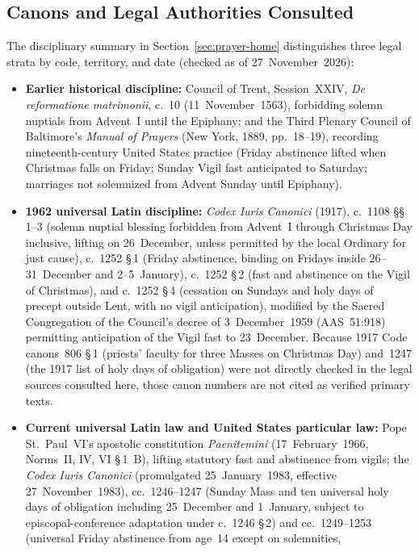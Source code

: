 \subsection{Canons and Legal Authorities Consulted}

The disciplinary summary in Section~\ref{sec:prayer-home} distinguishes three
legal strata by code, territory, and date (checked as of 27~November~2026):

\begin{itemize}
\item \textbf{Earlier historical discipline:} Council of Trent, Session~XXIV,
\textit{De reformatione matrimonii}, c.~10 (11~November~1563), forbidding solemn
nuptials from Advent~I until the Epiphany; and the Third Plenary Council of
Baltimore's \textit{Manual of Prayers} (New York, 1889, pp.~18--19), recording
nineteenth-century United States practice (Friday abstinence lifted when
Christmas falls on Friday; Sunday Vigil fast anticipated to Saturday; marriages
not solemnized from Advent Sunday until Epiphany).
\item \textbf{1962 universal Latin discipline:} \textit{Codex Iuris Canonici}
(1917), c.~1108 \S\S\,1--3 (solemn nuptial blessing forbidden from Advent~I
through Christmas Day inclusive, lifting on 26~December, unless permitted by the
local Ordinary for just cause), c.~1252 \S\,1 (Friday abstinence, binding on
Fridays inside 26--31~December and 2--5~January), c.~1252 \S\,2 (fast and
abstinence on the Vigil of Christmas), and c.~1252 \S\,4 (cessation on Sundays
and holy days of precept outside Lent, with no vigil anticipation), modified by
the Sacred Congregation of the Council's decree of 3~December~1959 (AAS~51:918)
permitting anticipation of the Vigil fast to 23~December. Because 1917 Code
canons~806 \S\,1 (priests' faculty for three Masses on Christmas Day) and~1247
(the 1917 list of holy days of obligation) were not directly checked in the
legal sources consulted here, those canon numbers are not cited as verified
primary texts.
\item \textbf{Current universal Latin law and United States particular law:}
Pope St.~Paul~VI's apostolic constitution \textit{Paenitemini}
(17~February~1966, Norms~II, IV, VI \S\,1~B), lifting statutory fast and
abstinence from vigils; the \textit{Codex Iuris Canonici} (promulgated
25~January~1983, effective 27~November~1983), cc.~1246--1247 (Sunday Mass and
ten universal holy days of obligation including 25~December and 1~January,
subject to episcopal-conference adaptation under c.~1246 \S\,2) and
cc.~1249--1253 (universal Friday abstinence from age~14 except on solemnities,

\end{itemize}
